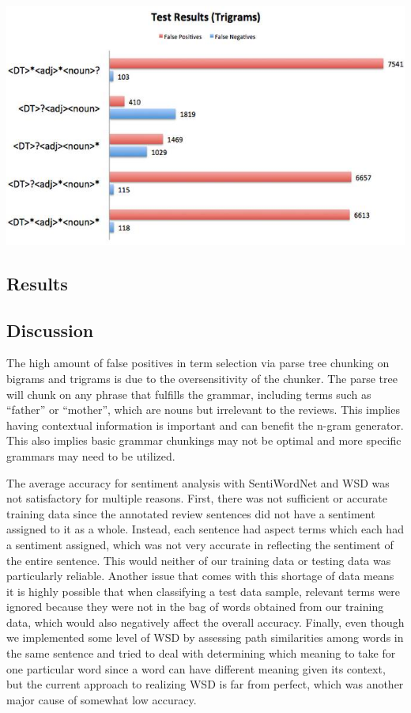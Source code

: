 \documentclass{article}
\begin{document}
\includegraphics[scale = 0.35]{trigramsFalse.jpg}
\subsection{Results}
\subsection{Discussion}
The high amount of false positives in term selection via parse tree chunking on bigrams and trigrams is due to the oversensitivity of the chunker. The parse tree will chunk on any phrase that fulfills the grammar, including terms such as “father” or “mother”, which are nouns but irrelevant to the reviews. This implies having contextual information is important and can benefit the n-gram generator. This also implies basic grammar chunkings may not be optimal and more specific grammars may need to be utilized.

The average accuracy for sentiment analysis with SentiWordNet and WSD was not satisfactory for multiple reasons. First, there was not sufficient or accurate training data since the annotated review sentences did not have a sentiment assigned to it as a whole. Instead, each sentence had aspect terms which each had a sentiment assigned, which was not very accurate in reflecting the sentiment of the entire sentence. This would neither of our training data or testing data was particularly reliable. Another issue that comes with this shortage of data means it is highly possible that when classifying a test data sample, relevant terms were ignored because they were not in the bag of words obtained from our training data, which would also negatively affect the overall accuracy. Finally, even though we implemented some level of WSD by assessing path similarities among words in the same sentence and tried to deal with determining which meaning to take for one particular word since a word can have different meaning given its context, but the current approach to realizing WSD is far from perfect, which was another major cause of somewhat low accuracy. 
\end{document}
